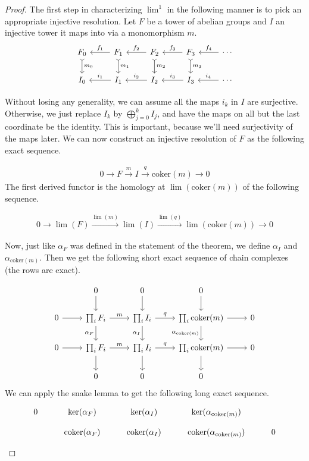 \documentclass[12pt, notitlepage]{article}
\theoremstyle{definition}
\newcommand{\coker}{\mathrm{coker}}
\begin{document}
\begin{proof}
  The first step in characterizing ${\lim}^1$ in the following manner is to pick an appropriate
  injective resolution. Let $F$ be a tower of abelian groups and $I$ an injective tower it maps into
  via a monomorphism $m$.
  \[
    \begin{tikzcd}
      F_0 \ar[d, rightarrowtail, "m_0"] & F_1 \ar[swap]{l}{f_1} \ar[d, rightarrowtail, "m_1"] & F_2 \ar[swap]{l}{f_2} \ar[d, rightarrowtail, "m_2"] & F_3 \ar[swap]{l}{f_3} \ar[d, rightarrowtail, "m_3"] & \cdots \ar[swap]{l}{f_4} \\
      I_0 & I_1 \ar[swap]{l}{i_1} & I_2 \ar[swap]{l}{i_2} & I_3 \ar[swap]{l}{i_3} & \cdots
      \ar[swap]{l}{i_4}
    \end{tikzcd}
  \]

  Without losing any generality, we can assume all the maps $i_k$ in $I$ are surjective. Otherwise,
  we just replace $I_k$ by $\bigoplus_{j=0}^k I_j$, and have the maps on all but the last coordinate
  be the identity.  This is important, because we'll need surjectivity of the maps later. We can now
  construct an injective resolution of $F$ as the following exact sequence.

\begin{align*}
  0 \xrightarrow{} F \xrightarrow{m} I \xrightarrow{q} \coker(m) \xrightarrow{} 0
\end{align*}
The first derived functor is the homology at $\lim(\coker(m))$ of the following sequence.

\begin{align*}
  0 \xrightarrow{} \lim(F) \xrightarrow{\lim(m)} \lim(I) \xrightarrow{\lim(q)} \lim(\coker(m)) \xrightarrow{} 0
\end{align*}

Now, just like $\alpha_F$ was defined in the statement of the theorem, we define $\alpha_I$ and
$\alpha_{\coker(m)}$.  Then we get the following short exact sequence of chain complexes (the rows
are exact).

\[
  \begin{tikzcd}
    & 0 \ar[d] & 0 \ar[d] & 0 \ar[d] & \\
    0 \ar[r] & \prod_{i} F_i \ar[r, "m"] \ar[d, swap, "\alpha_F"] & \prod_{i} I_i \ar[r, "q"] \ar[d, swap, "\alpha_I"] & \prod_{i} \coker(m) \ar[r] \ar[d, swap, "\alpha_{\coker(m)}"] & 0 \\
    0 \ar[r] & \prod_{i} F_i \ar[r, "m"] \ar[d] & \prod_{i} I_i \ar[r, "q"] \ar[d] & \prod_{i} \coker(m) \ar[r] \ar[d] & 0 \\
    & 0 & 0 & 0 &
  \end{tikzcd}
\]
We can apply the snake lemma to get the following long exact sequence.
\[
  \begin{tikzpicture}[descr/.style={fill=white,inner sep=1.5pt}]
    \matrix (m) [ matrix of math nodes, row sep=1em, column sep=2.5em, text height=1.5ex, text
    depth=0.25ex ]
    { 0 & \ker(\alpha_F) & \ker(\alpha_I) & \ker(\alpha_{\coker(m)}) & \\
      & \coker(\alpha_F) & \coker(\alpha_I) & \coker(\alpha_{\coker(m)}) & 0 \\
    };


\end{tikzpicture}\]
\end{proof}
\end{document}
